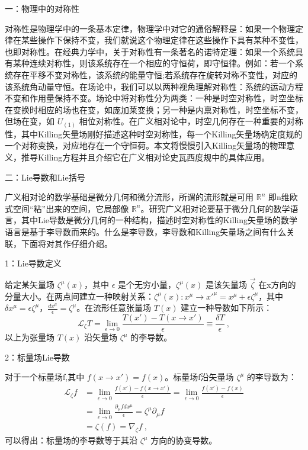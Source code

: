 
一：物理中的对称性

对称性是物理学中的一条基本定律，物理学中对它的通俗解释是：如果一个物理定律在某些操作下保持不变，我们就说这个物理定律在这些操作下具有某种不变性，也即对称性。在经典力学中，关于对称性有一条著名的诺特定理：如果一个系统具有某种连续对称性，则该系统存在一个相应的守恒荷，即守恒律。例如：若一个系统存在平移不变对称性，该系统的能量守恒;若系统存在旋转对称不变性，对应的该系统角动量守恒。在场论中，我们可以以两种视角理解对称性：系统的运动方程不变和作用量保持不变。场论中将对称性分为两类：一种是时空对称性，时空坐标在变换时相应的场也在变，如庞加莱变换；另一种是内禀对称性，时空坐标不变，但场在变，如 $U_{(1)}$ 相位对称性。在广义相对论中，时空几何存在一种重要的对称性，其中Killing矢量场刚好描述这种时空对称性，每一个Killing矢量场确定度规的一个对称变换，对应地存在一个守恒荷。本文将慢慢引入Killing矢量场的物理意义，推导Killing方程并且介绍它在广义相对论史瓦西度规中的具体应用。

 二：Lie导数和Lie括号

广义相对论的数学基础是微分几何和微分流形，所谓的流形就是可用 $\mathbb{R}^{n}$ 即n维欧式空间“粘”出来的空间，它局部像 $\mathbb{R}^{n}$。研究广义相对论要基于微分几何的数学语言，其中Lie导数是微分几何的一种结构，描述时空对称性的Killing矢量场的数学语言是基于李导数而来的。什么是李导数，李导数和Killing矢量场之间有什么关联，下面将对其作仔细介绍。

1：Lie导数定义

给定某矢量场 $\zeta^{\mu}(x)$，其中 $\epsilon$ 是个无穷小量，$\zeta^{\mu}(x)$ 是该矢量场 $\overrightarrow{\zeta}$ 在x方向的分量大小。在两点间建立一种映射关系：$\zeta^{\mu}(x):x^{\mu}\rightarrow x'^{\mu}=x^{\mu}+\epsilon\zeta^{\mu}$，其中 $\delta x^{\mu}=\epsilon\zeta^{\mu}$，$\frac{d x^{\mu}}{\epsilon}=\zeta^{\mu}$。在流形任意张量场 $T(x)$ 建立一种导数如下所示：
\begin{equation}
\mathcal{L}_{\zeta}T=\lim_{\epsilon\rightarrow0}\frac{T(x')-T(x\rightarrow x')}{\epsilon}\equiv \frac{\delta T}{\epsilon}~,
\end{equation}
以上为张量场 $T(x)$ 沿矢量场 $\zeta^{\mu}$ 的李导数。

2：标量场Lie导数

对于一个标量场f,其中 $f(x\rightarrow x')=f(x)$。标量场f沿矢量场 $\zeta^{\mu}$ 的李导数为：
$$\begin{aligned}
\mathcal{L}_{\zeta} f &=\lim _{\epsilon \rightarrow 0} \frac{f(x')-f(x \rightarrow x')}{\epsilon}=\lim _{\epsilon \rightarrow 0} \frac{f(x')-f(x)}{\epsilon} \\
&=\lim _{\epsilon\rightarrow 0} \frac{\partial_{\mu} fd x^{\mu}}{\epsilon}=\zeta^{\mu}\partial_{\mu}f \\
&=\zeta(f)=\nabla_{\zeta}f~,
\end{aligned}$$
可以得出：标量场的李导数等于其沿 $\zeta^{\mu}$ 方向的协变导数。

